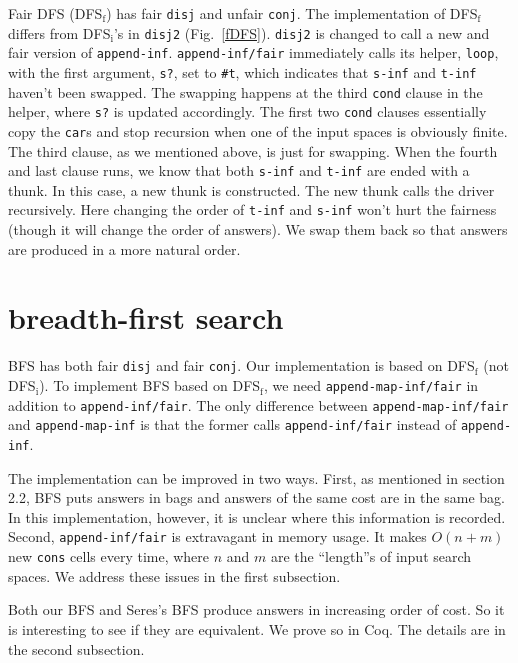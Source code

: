 \documentclass[format=acmlarge, review=true, authordraft=true]{acmart}
\newcommand{\conj}{\texttt{conj}}
\newcommand{\disj}{\texttt{disj}}
\newcommand{\DFSi }[0]{DFS$_\textrm{i}$}
\newcommand{\DFSf }[0]{DFS$_\textrm{f}$}
\newcommand{\BFS  }[0]{BFS}
\begin{document}
Fair DFS (\DFSf) has fair \disj{} and unfair \conj{}. The 
implementation of \DFSf{} differs from \DFSi{}'s in 
\texttt{disj2} (Fig.~\ref{fDFS}). \texttt{disj2} is changed to call a new and 
fair version of \texttt{append-inf}. \texttt{append-inf/fair} immediately calls 
its helper, \texttt{loop}, with the first argument, \texttt{s?}, set to 
\texttt{\#{}t}, which indicates that 
\texttt{s-inf} and \texttt{t-inf} haven't been swapped. The swapping happens at 
the third \texttt{cond} clause in the helper, where \texttt{s?} is updated 
accordingly. The first two \texttt{cond} clauses essentially copy the 
\texttt{car}s and stop recursion when one of the input spaces is obviously 
finite. The third clause, as we mentioned above, is just for swapping. When the 
fourth and last clause runs, we know that both \texttt{s-inf} and \texttt{t-inf} 
are ended with a thunk. In this case, a new thunk is constructed. The new thunk 
calls the driver recursively. Here changing the order of \texttt{t-inf} and 
\texttt{s-inf} won't hurt the fairness (though it will change the order of 
answers). We swap them back so that answers are produced in a more natural 
order.


\section{breadth-first search}

BFS has both fair \disj{} and fair \conj{}. Our implementation is based on 
DFS$_\textrm{f}$ (not DFS$_\textrm{i}$). To implement \BFS{} based on \DFSf{}, 
we need \texttt{append-map-inf/fair} in addition to \texttt{append-inf/fair}. 
The only difference between \texttt{append-map-inf/fair} and 
\texttt{append-map-inf} is that the former calls \texttt{append-inf/fair} 
instead of \texttt{append-inf}.

The implementation can be improved in two ways. First, as mentioned in 
section 2.2, BFS puts answers in bags and answers of the same cost are in the 
same bag. In this implementation, however, it is unclear where this information 
is recorded. Second, \texttt{append-inf/fair} is extravagant in memory usage. It 
makes $O(n+m)$ new \texttt{cons} cells every time, where $n$ and $m$ are the 
``length''s of input search spaces. We address these issues in the first 
subsection.

Both our BFS and Seres's BFS \citet{seres1999algebra} produce answers in 
increasing order of cost. So it is interesting to see if they are equivalent. 
We prove so in Coq. The details are in the second subsection.
\end{document}

